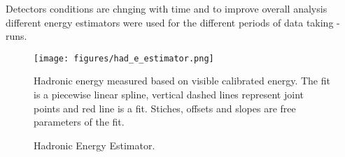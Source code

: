 Detectors conditions are chnging with time and to improve overall analysis different energy estimators were used
for the different periods of data taking - runs.
\begin{figure}[t]
\texttt{[image: figures/had\_e\_estimator.png]}
\centering
\caption{Hadronic Energy Estimator.}
{Hadronic energy measured based on visible calibrated energy. The fit is a piecewise linear spline, vertical 
dashed lines represent joint points and red line is a fit. Stiches, offsets and slopes are free parameters of the
fit.}
\label{fig:hade_fit}
\end{figure}
